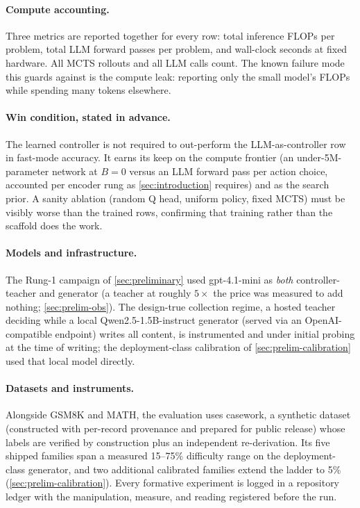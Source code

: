 \paragraph{Compute accounting.} Three metrics are reported together for
every row: total inference FLOPs per problem, total LLM forward passes per
problem, and wall-clock seconds at fixed hardware. All MCTS rollouts and all
LLM calls count. The known failure mode this guards against is the compute
leak: reporting only the small model's FLOPs while spending many tokens
elsewhere.

\paragraph{Win condition, stated in advance.} The learned controller is not
required to out-perform the LLM-as-controller row in fast-mode accuracy. It
earns its keep on the compute frontier (an under-5M-parameter network at
$B{=}0$ versus an LLM forward pass per action choice, accounted per
encoder rung as \cref{sec:introduction} requires) and as the search
prior. A sanity ablation (random Q head, uniform policy, fixed MCTS) must be
visibly worse than the trained rows, confirming that training rather than
the scaffold does the work.

\paragraph{Models and infrastructure.} The Rung-1 campaign of
\cref{sec:preliminary} used gpt-4.1-mini as \emph{both} controller-teacher
and generator (a teacher at roughly $5\times$ the price was measured to
add nothing; \cref{sec:prelim-obs}). The design-true collection regime,
a hosted teacher deciding while a local Qwen2.5-1.5B-instruct generator
(served via an OpenAI-compatible endpoint) writes all content, is
instrumented and under initial probing at the time of writing; the
deployment-class calibration of \cref{sec:prelim-calibration} used that
local model directly. 

\paragraph{Datasets and instruments.} Alongside GSM8K and MATH, the
evaluation uses casework, a synthetic dataset (constructed with
per-record provenance and prepared for public release) whose labels are
verified by construction plus an independent re-derivation. Its five
shipped families span a measured 15--75\% difficulty range on the
deployment-class generator, and two additional calibrated families
extend the ladder to 5\% (\cref{sec:prelim-calibration}). Every
formative experiment is logged in a repository ledger with the
manipulation, measure, and reading registered before the run.


